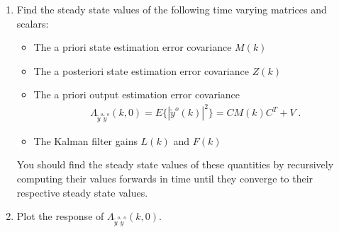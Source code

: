 \begin{enumerate}

    \item
    Find the steady state values of the following time varying matrices and scalars:
    \begin{itemize}

        \item
        The a priori state estimation error covariance $M(k)$

        \item
        The a posteriori state estimation error covariance $Z(k)$

        \item
        The a priori output estimation error covariance
        \begin{align*}
            \Lambda_{\tilde{y}^o \tilde{y}^o}(k,0) = E \{ | \tilde{y}^o(k) |^2 \} = CM(k) C^T + V \; .
        \end{align*}

        \item
        The Kalman filter gains $L(k)$ and $F(k)$

    \end{itemize}
    You should find the steady state values of these quantities by recursively computing their values forwards in time until they converge to their respective steady state values.

    \item
    Plot the response of $\Lambda_{\tilde{y}^o \tilde{y}^o}(k,0)$.
\end{enumerate}
%


